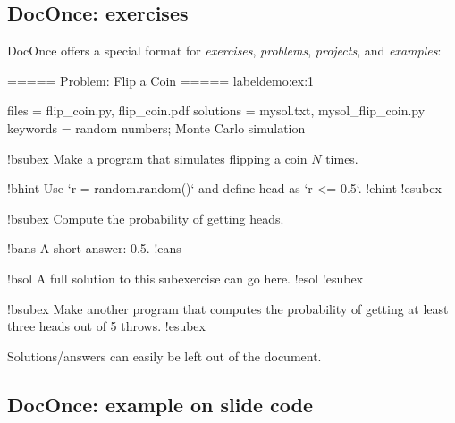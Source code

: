 \documentclass[%
oneside,                 %
final,                   %
10pt]{article}
\begin{document}
\subsection{DocOnce: exercises}

DocOnce offers a special format for \emph{exercises}, \emph{problems}, \emph{projects},
and \emph{examples}:

































\bccq
===== Problem: Flip a Coin =====
label{demo:ex:1}

files = flip_coin.py, flip_coin.pdf
solutions = mysol.txt, mysol_flip_coin.py
keywords = random numbers; Monte Carlo simulation

!bsubex
Make a program that simulates flipping a coin $N$ times.

!bhint
Use `r = random.random()` and define head as `r <= 0.5`.
!ehint
!esubex

!bsubex
Compute the probability of getting heads.

!bans
A short answer: 0.5.
!eans

!bsol
A full solution to this subexercise can go here.
!esol
!esubex

!bsubex
Make another program that computes the probability
of getting at least three heads out of 5 throws.
!esubex

\eccq


Solutions/answers can easily be left out of the document.

\subsection{DocOnce: example on slide code}
\end{document}
